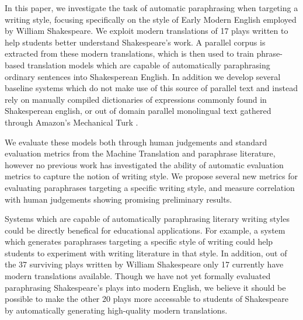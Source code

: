 \documentclass[10pt,a5paper,twoside]{article}
\begin{document}
In this paper, we investigate the task of automatic paraphrasing when targeting a writing style, focusing specifically on the style of Early Modern English employed by William Shakespeare.
We exploit modern translations of 17 plays written to help students better understand Shakespeare's work.  A parallel corpus is extracted from these modern translations,
which is then used to train phrase-based translation models which are capable of automatically paraphrasing ordinary sentences into Shakesperean English.  In addition we develop several
baseline systems which do not make use of this source of parallel text and instead rely on manually compiled dictionaries of expressions commonly found in Shakesperean english, or out of
domain parallel monolingual text gathered through Amazon's Mechanical Turk \cite{chen11}.

We evaluate these models both through human judgements and standard evaluation metrics from the Machine Translation and paraphrase literature, however no previous work has investigated the ability of automatic
evaluation metrics to capture the notion of writing style.  We propose several new metrics for evaluating paraphrases targeting a specific writing style, and measure correlation with human judgements showing  promising
preliminary results.

Systems which are capable of automatically paraphrasing literary writing styles could be directly benefical for educational applications.  For example, a system which generates paraphrases targeting a specific style
of writing could help students to experiment with writing literature in that style.
In addition, out of the 37 surviving plays written by William Shakespeare only 17 currently have modern translations available.  Though we have not yet formally evaluated
paraphrasing Shakespeare's plays into modern English, we believe it should be possible to make the other 20 plays more accessable to students of Shakespeare by automatically 
generating high-quality modern translations.

\end{document}
